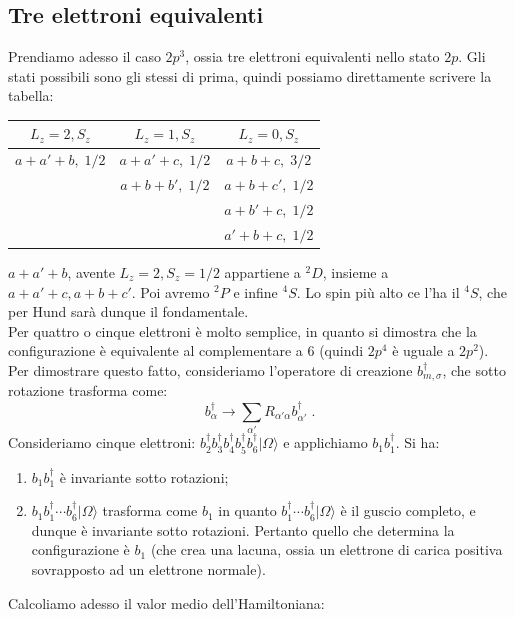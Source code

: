 \documentclass[12pt,a4paper]{report}
\theoremstyle{definition}
\numberwithin{equation}{section}
\newcommand{\ket}{\rangle}
\newcommand{\adj}[1]{#1^{\dagger}}
\begin{document}
\subsection{Tre elettroni equivalenti}
Prendiamo adesso il caso $2p^3$, ossia tre elettroni equivalenti nello stato $2p$. Gli stati possibili sono gli stessi di prima, quindi possiamo direttamente scrivere la tabella:

\begin{table}[h]
\centering
\begin{tabular}{c|c|c}
\toprule
\multicolumn{1}{c|}{$L_z=2, S_z$} &
\multicolumn{1}{c|}{$L_z=1, S_z$} &
\multicolumn{1}{c}{$L_z=0, S_z$} \\
\midrule
$a+a'+b,\; 1/2$ & $a+a'+c,\; 1/2$ & $a+b+c,\; 3/2$ \\
{} & $a+b+b',\; 1/2$ & $a+b+c',\; 1/2$ \\
{} & {} & $a+b'+c,\; 1/2$ \\
{} & {} & $a'+b+c,\; 1/2$ \\
\bottomrule
\end{tabular}
\end{table}
$a+a'+b$, avente $L_z=2, S_z=1/2$ appartiene a ${}^2D$, insieme a $a+a'+c,a+b+c'$. Poi avremo ${}^2P$ e infine ${}^4S$. Lo spin più alto ce l'ha il ${}^4S$, che per Hund sarà dunque il fondamentale. \\
Per quattro o cinque elettroni è molto semplice, in quanto si dimostra che la configurazione è equivalente al complementare a 6 (quindi $2p^4$ è uguale a $2p^2$). Per dimostrare questo fatto, consideriamo l'operatore di creazione $\adj{b_{m,\sigma}}$, che sotto rotazione trasforma come:
\begin{equation}
\adj{b_{\alpha}} \longrightarrow \sum_{\alpha'} R_{\alpha'\alpha}\adj{b_{\alpha'}}\;.
\end{equation}
Consideriamo cinque elettroni: $\adj{b_2}\adj{b_3}\adj{b_4}\adj{b_5}\adj{b_6}|\Omega\ket$ e applichiamo $b_1\adj{b_1}$. Si ha:
\begin{enumerate}
\item $b_1\adj{b_1}$ è invariante sotto rotazioni;
\item $b_1\adj{b_1}\cdots\adj{b_6}|\Omega\ket$ trasforma come $b_1$ in quanto $\adj{b_1}\cdots\adj{b_6}|\Omega\ket$ è il guscio completo, e dunque è invariante sotto rotazioni. Pertanto quello che determina la configurazione è $b_1$ (che crea una lacuna, ossia un elettrone di carica positiva sovrapposto ad un elettrone normale).
\end{enumerate}
Calcoliamo adesso il valor medio dell'Hamiltoniana:
\end{document}
